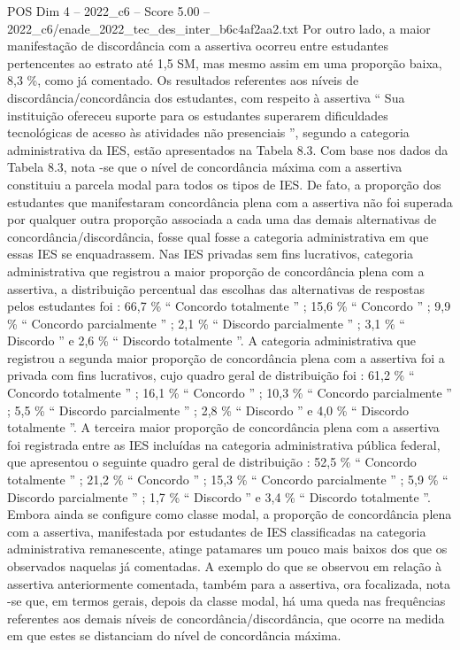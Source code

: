 \begin{textsample}{POS Dim 4 – 2022\_c6 – Score 5.00 – 2022\_c6/enade\_2022\_tec\_des\_inter\_b6c4af2aa2.txt}
Por outro lado, a maior manifestação de discordância com a assertiva ocorreu entre estudantes pertencentes ao estrato até 1,5 SM, mas mesmo assim em uma proporção baixa, 8,3 \%, como já comentado.
Os resultados referentes aos níveis de discordância/concordância dos estudantes, com respeito à assertiva “ Sua instituição ofereceu suporte para os estudantes superarem dificuldades tecnológicas de acesso às atividades não presenciais ”, segundo a categoria administrativa da IES, estão apresentados na Tabela 8.3.
Com base nos dados da Tabela 8.3, nota -se que o nível de concordância máxima com a assertiva constituiu a parcela modal para todos os tipos de IES.
De fato, a proporção dos estudantes que manifestaram concordância plena com a assertiva não foi superada por qualquer outra proporção associada a cada uma das demais alternativas de concordância/discordância, fosse qual fosse a categoria administrativa em que essas IES se enquadrassem.
Nas IES privadas sem fins lucrativos, categoria administrativa que registrou a maior proporção de concordância plena com a assertiva, a distribuição percentual das escolhas das alternativas de respostas pelos estudantes foi : 66,7 \% “ Concordo totalmente ” ; 15,6 \% “ Concordo ” ; 9,9 \% “ Concordo parcialmente ” ; 2,1 \% “ Discordo parcialmente ” ; 3,1 \% “ Discordo ” e 2,6 \% “ Discordo totalmente ”.
A categoria administrativa que registrou a segunda maior proporção de concordância plena com a assertiva foi a privada com fins lucrativos, cujo quadro geral de distribuição foi : 61,2 \% “ Concordo totalmente ” ; 16,1 \% “ Concordo ” ; 10,3 \% “ Concordo parcialmente ” ; 5,5 \% “ Discordo parcialmente ” ; 2,8 \% “ Discordo ” e 4,0 \% “ Discordo totalmente ”.
A terceira maior proporção de concordância plena com a assertiva foi registrada entre as IES incluídas na categoria administrativa pública federal, que apresentou o seguinte quadro geral de distribuição : 52,5 \% “ Concordo totalmente ” ; 21,2 \% “ Concordo ” ; 15,3 \% “ Concordo parcialmente ” ; 5,9 \% “ Discordo parcialmente ” ; 1,7 \% “ Discordo ” e 3,4 \% “ Discordo totalmente ”.
Embora ainda se configure como classe modal, a proporção de concordância plena com a assertiva, manifestada por estudantes de IES classificadas na categoria administrativa remanescente, atinge patamares um pouco mais baixos dos que os observados naquelas já comentadas.
A exemplo do que se observou em relação à assertiva anteriormente comentada, também para a assertiva, ora focalizada, nota -se que, em termos gerais, depois da classe modal, há uma queda nas frequências referentes aos demais níveis de concordância/discordância, que ocorre na medida em que estes se distanciam do nível de concordância máxima.

\end{textsample}
